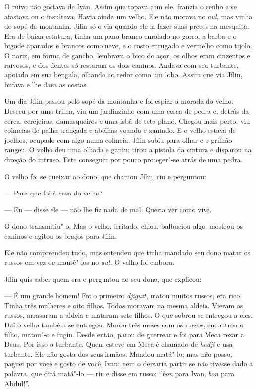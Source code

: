 O ruivo não gostava de Ivan. Assim que topava com ele, franzia o cenho e
se afastava ou o insultava. Havia ainda um velho. Ele não morava no
\emph{aul,} mas vinha do sopé da montanha. Jílin só o via quando ele ia
fazer suas preces na mesquita. Era de baixa estatura, tinha um pano
branco enrolado no gorro, a barba e o bigode aparados e brancos como
neve, e o rosto enrugado e vermelho como tijolo. O nariz, em forma de
gancho, lembrava o bico do açor, os olhos eram cinzentos e raivosos, e
dos dentes só restaram os dois caninos. Andava com seu turbante, apoiado
em sua bengala, olhando ao redor como um lobo. Assim que via Jílin,
bufava e lhe dava as costas.

Um dia Jílin passou pelo sopé da montanha e foi espiar a morada do
velho. Desceu por uma trilha, viu um jardinzinho com uma cerca de pedra
e, detrás da cerca, cerejeiras, damasqueiros e uma isbá de teto plano.
Chegou mais perto; viu colmeias de palha trançada e abelhas voando e
zunindo. E o velho estava de joelhos, ocupado com algo numa colmeia.
Jílin subiu para olhar e o grilhão rangeu. O velho deu uma olhada e
ganiu; tirou a pistola da cintura e disparou na direção do intruso. Este
conseguiu por pouco proteger"-se atrás de uma pedra.

O velho foi se queixar ao dono, que chamou Jílin, riu e perguntou:

--- Para que foi à casa do velho?

--- Eu --- disse ele --- não lhe fiz nada de mal. Queria ver como vive.

O dono transmitiu"-o. Mas o velho, irritado, chiou, balbuciou algo,
mostrou os caninos e agitou os braços para Jílin.

Ele não compreendeu tudo, mas entendeu que tinha mandado seu dono matar os
russos em vez de mantê"-los no \emph{aul.} O velho foi embora.

Jílin quis saber quem era e perguntou ao seu dono, que explicou:

--- É um grande homem! Foi o primeiro \emph{djiguit,} matou muitos
russos, era rico. Tinha três mulheres e oito filhos. Todos moravam na
mesma aldeia. Vieram os russos, arrasaram a aldeia e mataram sete
filhos. O que sobrou se entregou a eles. Daí o velho também se entregou.
Morou três meses com os russos, encontrou o filho, matou"-o e fugiu.
Desde então, parou de guerrear e foi para Meca rezar a Deus. Por isso o
turbante. Quem esteve em Meca é chamado de \emph{hadji} e usa turbante.
Ele não gosta dos seus irmãos. Mandou matá"-lo; mas não posso, paguei por
você e gosto de você, Ivan; nem o deixaria partir se não tivesse dado a
palavra, que dirá matá"-lo --- riu e disse em russo: ``\emph{bon} para
Ivan, \emph{bon} para Abdul!''.

